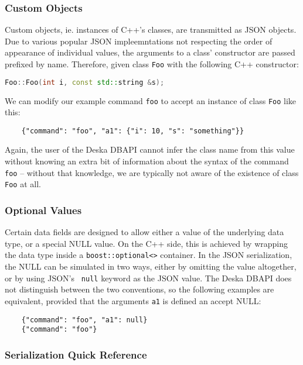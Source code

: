 \documentclass{article}
\begin{document}
\subsubsection{Custom Objects}

Custom objects, ie. instances of C++'s classes, are transmitted as JSON objects. Due to various popular JSON
impleemntations not respecting the order of appearance of individual values, the arguments to a class' constructor are
passed prefixed by name.  Therefore, given class {\tt Foo} with the following C++ constructor:

\begin{lstlisting}[language=c++]
    Foo::Foo(int i, const std::string &s);
\end{lstlisting}

We can modify our example command {\tt foo} to accept an instance of class {\tt Foo} like this:

\begin{lstlisting}
    {"command": "foo", "a1": {"i": 10, "s": "something"}}
\end{lstlisting}

Again, the user of the Deska DBAPI cannot infer the class name from this value without knowing an extra bit of
information about the syntax of the command {\tt foo} -- without that knowledge, we are typically not aware of the
existence of class {\tt Foo} at all.

\subsubsection{Optional Values}

Certain data fields are designed to allow either a value of the underlying data type, or a special NULL value.  On the
C++ side, this is achieved by wrapping the data type inside a {\tt boost::optional<>} container.  In the JSON
serialization, the NULL can be simulated in two ways, either by omitting the value altogether, or by using JSON's {\tt
null} keyword as the JSON value.  The Deska DBAPI does not distinguish between the two conventions, so the following
examples are equivalent, provided that the arguments {\tt a1} is defined an accept NULL:

\begin{lstlisting}
    {"command": "foo", "a1": null}
    {"command": "foo"}
\end{lstlisting}

\subsubsection{Serialization Quick Reference}
\label{sec:json-data-types-reference}
\end{document}
